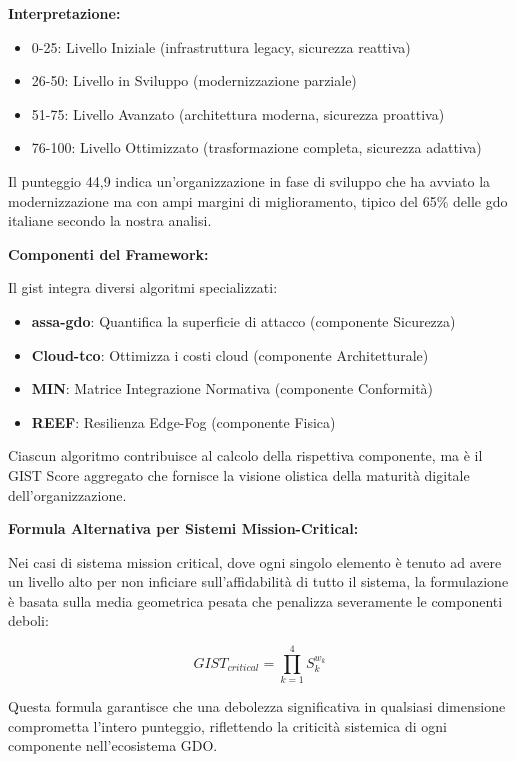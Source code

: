 \begin{tcolorbox}
\vspace{0.3cm}
\textbf{Interpretazione:}
\begin{itemize}
    \item 0-25: Livello Iniziale (infrastruttura legacy, sicurezza reattiva)
    \item 26-50: Livello in Sviluppo (modernizzazione parziale)
    \item 51-75: Livello Avanzato (architettura moderna, sicurezza proattiva)
    \item 76-100: Livello Ottimizzato (trasformazione completa, sicurezza adattiva)
\end{itemize}

Il punteggio 44,9 indica un'organizzazione in fase di sviluppo che ha avviato la modernizzazione ma con ampi margini di miglioramento, tipico del 65\% delle \gls{gdo} italiane secondo la nostra analisi.

\vspace{0.3cm}
\textbf{Componenti del Framework:}

Il \gls{gist} integra diversi algoritmi specializzati:
\begin{itemize}
    \item \textbf{\gls{assa-gdo}}: Quantifica la superficie di attacco (componente Sicurezza)
    \item \textbf{Cloud-\gls{tco}}: Ottimizza i costi cloud (componente Architetturale)
    \item \textbf{MIN}: Matrice Integrazione Normativa (componente Conformità)
    \item \textbf{REEF}: Resilienza Edge-Fog (componente Fisica)
\end{itemize}

Ciascun algoritmo contribuisce al calcolo della rispettiva componente, ma è il GIST Score aggregato che fornisce la visione olistica della maturità digitale dell'organizzazione.

\vspace{0.3cm}
\textbf{Formula Alternativa per Sistemi Mission-Critical:}

Nei casi di sistema mission critical, dove ogni singolo elemento è tenuto ad avere un livello alto per non inficiare sull'affidabilità di tutto il sistema, la formulazione è basata sulla media geometrica pesata che penalizza severamente le componenti deboli:

$$GIST_{critical} = \prod_{k=1}^{4} S_k^{w_k}$$

Questa formula garantisce che una debolezza significativa in qualsiasi dimensione comprometta l'intero punteggio, riflettendo la criticità sistemica di ogni componente nell'ecosistema GDO.


\end{tcolorbox}

